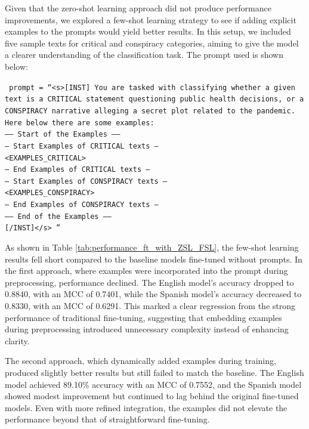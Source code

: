 \documentclass{Configuration_Files/PoliMi3i_thesis}
\begin{document}
Given that the zero-shot learning approach did not produce performance improvements, we explored a few-shot learning strategy to see if adding explicit examples to the prompts would yield better results. In this setup, we included five sample texts for critical and conspiracy categories, aiming to give the model a clearer understanding of the classification task. The prompt used is shown below:
\begin{center}
\begin{flushleft}
\footnotesize
\texttt{
prompt = \textquotedblleft \mbox{<s>[INST]}
You are tasked with classifying whether a given text is a CRITICAL statement questioning public health decisions, or a CONSPIRACY narrative alleging a secret plot related to the pandemic.\\
Here below there are some examples: \\
------ Start of the Examples ----- \\
-- Start Examples of CRITICAL texts --  \\
<EXAMPLES\_CRITICAL> \\
-- End Examples of CRITICAL texts --  \\
-- Start Examples of CONSPIRACY texts -- \\
<EXAMPLES\_CONSPIRACY> \\
-- End Examples of CONSPIRACY texts -- \\
------ End of the Examples ------ \\
\mbox{[/INST]</s>} \textquotedblright \\
}
\end{flushleft}
\end{center}
As shown in Table \ref{tab:performance_ft_with_ZSL_FSL}, the few-shot learning results fell short compared to the baseline models fine-tuned without prompts. In the first approach, where examples were incorporated into the prompt during preprocessing, performance declined. The English model's accuracy dropped to 0.8840, with an MCC of 0.7401, while the Spanish model's accuracy decreased to 0.8330, with an MCC of 0.6291. This marked a clear regression from the strong performance of traditional fine-tuning, suggesting that embedding examples during preprocessing introduced unnecessary complexity instead of enhancing clarity.

The second approach, which dynamically added examples during training, produced slightly better results but still failed to match the baseline. The English model achieved 89.10\% accuracy with an MCC of 0.7552, and the Spanish model showed modest improvement but continued to lag behind the original fine-tuned models. Even with more refined integration, the examples did not elevate the performance beyond that of straightforward fine-tuning.
\end{document}
